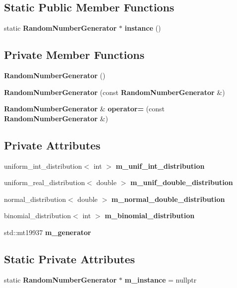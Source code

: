 \subsection*{Static Public Member Functions}
\begin{DoxyCompactItemize}
\item 
static \textbf{ Random\+Number\+Generator} $\ast$ \textbf{ instance} ()
\end{DoxyCompactItemize}
\subsection*{Private Member Functions}
\begin{DoxyCompactItemize}
\item 
\textbf{ Random\+Number\+Generator} ()
\item 
\textbf{ Random\+Number\+Generator} (const \textbf{ Random\+Number\+Generator} \&)
\item 
\textbf{ Random\+Number\+Generator} \& \textbf{ operator=} (const \textbf{ Random\+Number\+Generator} \&)
\end{DoxyCompactItemize}
\subsection*{Private Attributes}
\begin{DoxyCompactItemize}
\item 
uniform\+\_\+int\+\_\+distribution$<$ int $>$ \textbf{ m\+\_\+unif\+\_\+int\+\_\+distribution}
\item 
uniform\+\_\+real\+\_\+distribution$<$ double $>$ \textbf{ m\+\_\+unif\+\_\+double\+\_\+distribution}
\item 
normal\+\_\+distribution$<$ double $>$ \textbf{ m\+\_\+normal\+\_\+double\+\_\+distribution}
\item 
binomial\+\_\+distribution$<$ int $>$ \textbf{ m\+\_\+binomial\+\_\+distribution}
\item 
std\+::mt19937 \textbf{ m\+\_\+generator}
\end{DoxyCompactItemize}
\subsection*{Static Private Attributes}
\begin{DoxyCompactItemize}
\item 
static \textbf{ Random\+Number\+Generator} $\ast$ \textbf{ m\+\_\+instance} = nullptr
\end{DoxyCompactItemize}


